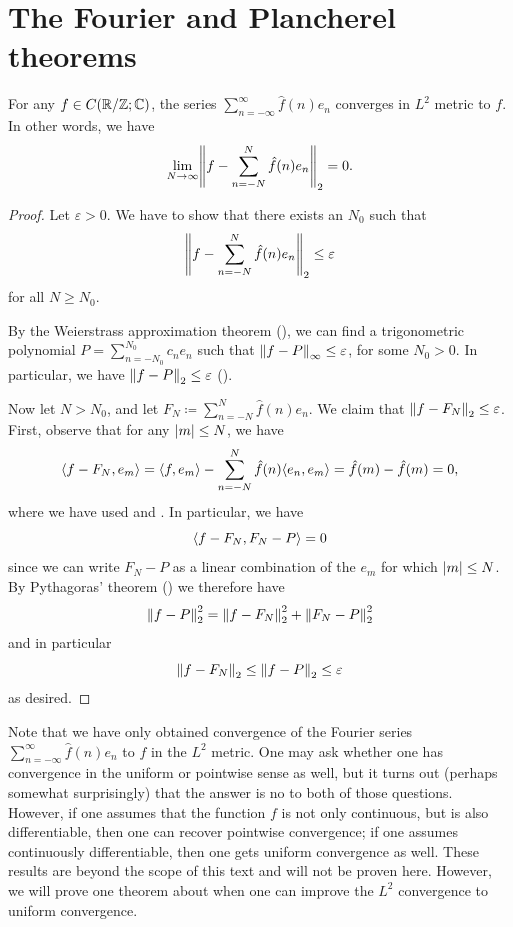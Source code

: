 \section{The Fourier and Plancherel theorems}\label{ii:sec:5.5}

\begin{thm}\label{ii:5.5.1}
  For any \(f \in C(\R / \Z ; \C)\), the series \(\sum_{n = -\infty}^\infty \hat{f}(n) e_n\) converges in \(L^2\) metric to \(f\).
  In other words, we have
  \[
    \lim_{N \to \infty} \norm*{f - \sum_{n = -N}^N \hat{f}(n) e_n}_2 = 0.
  \]
\end{thm}

\begin{proof}
  Let \(\varepsilon > 0\).
  We have to show that there exists an \(N_0\) such that
  \[
    \norm*{f - \sum_{n = -N}^N \hat{f}(n) e_n}_2 \leq \varepsilon
  \]
  for all \(N \geq N_0\).

  By the Weierstrass approximation theorem (), we can find a trigonometric polynomial \(P = \sum_{n = -N_0}^{N_0} c_n e_n\) such that \(\norm*{f - P}_{\infty} \leq \varepsilon\), for some \(N_0 > 0\).
  In particular, we have \(\norm*{f - P}_2 \leq \varepsilon\) ().

  Now let \(N > N_0\), and let \(F_N \coloneqq \sum_{n = -N}^N \hat{f}(n) e_n\).
  We claim that \(\norm*{f - F_N}_2 \leq \varepsilon\).
  First, observe that for any \(\abs{m} \leq N\), we have
  \[
    \inner*{f - F_N, e_m} = \inner*{f, e_m} - \sum_{n = -N}^N \hat{f}(n) \inner*{e_n, e_m} = \hat{f}(m) - \hat{f}(m) = 0,
  \]
  where we have used  and .
  In particular, we have
  \[
    \inner*{f - F_N, F_N - P} = 0
  \]
  since we can write \(F_N - P\) as a linear combination of the \(e_m\) for which \(\abs{m} \leq N\).
  By Pythagoras' theorem () we therefore have
  \[
    \norm*{f - P}_2^2 = \norm*{f - F_N}_2^2 + \norm*{F_N - P}_2^2
  \]
  and in particular
  \[
    \norm*{f - F_N}_2 \leq \norm*{f - P}_2 \leq \varepsilon
  \]
  as desired.
\end{proof}

\begin{rmk}\label{ii:5.5.2}
  Note that we have only obtained convergence of the Fourier series \(\sum_{n = -\infty}^\infty \hat{f}(n) e_n\) to \(f\) in the \(L^2\) metric.
  One may ask whether one has convergence in the uniform or pointwise sense as well, but it turns out (perhaps somewhat surprisingly) that the answer is no to both of those questions.
  However, if one assumes that the function \(f\) is not only continuous, but is also differentiable, then one can recover pointwise convergence;
  if one assumes continuously differentiable, then one gets uniform convergence as well.
  These results are beyond the scope of this text and will not be proven here.
  However, we will prove one theorem about when one can improve the \(L^2\) convergence to uniform convergence.
\end{rmk}

